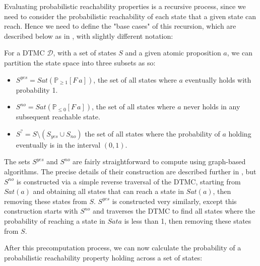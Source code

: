 Evaluating probabilistic reachability properties is a recursive process, since we need to consider the probabilistic reachability of each state that a given state can reach. Hence we need to define the "base cases" of this recursion, which are described below as in \cite{kwiatkowska_stochastic_2007}, with slightly different notation:

\begin{definition}
\label{back:S_yes}

    For a DTMC $\mathcal{D}$, with a set of states $S$ and a given atomic proposition $a$, we can partition the state space into three subsets as so:

    \begin{itemize}
        
        \item $S^{yes} = Sat(\mathbb{P}_{\geq 1}[F \: a])$, the set of all states where $a$ eventually holds with probability 1.
        \item $S^{no} = Sat(\mathbb{P}_{\leq 0}[F \: a])$, the set of all states where $a$ never holds in any subsequent reachable state.
        \item $S^{?} = S \setminus (S_{yes} \cup S_{no})$ the set of all states where the probability of $a$ holding eventually is in the interval $(0,1)$.

    \end{itemize}

\end{definition}

The sets $S^{yes}$ and $S^{no}$ are fairly straightforward to compute using graph-based algorithms. The precise details of their construction are described further in \cite{kwiatkowska_stochastic_2007}, but $S^{no}$ is constructed via a simple reverse traversal of the DTMC, starting from $Sat(a)$ and obtaining all states that can reach a state in $Sat(a)$, then removing these states from $S$. $S^{yes}$ is constructed very similarly, except this construction starts with $S^{no}$ and traverses the DTMC to find all states where the probability of reaching a state in $Sat{a}$ is less than 1, then removing these states from $S$.

After this precomputation process, we can now calculate the probability of a probabilistic reachability property holding across a set of states:


